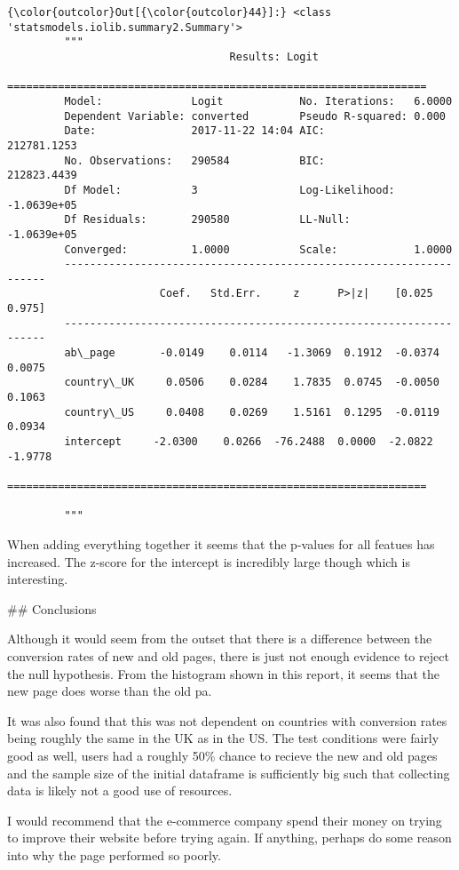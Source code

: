 \documentclass[11pt]{article}
\begin{document}
\begin{Verbatim}[commandchars=\\\{\}]
{\color{outcolor}Out[{\color{outcolor}44}]:} <class 'statsmodels.iolib.summary2.Summary'>
         """
                                   Results: Logit
         ==================================================================
         Model:              Logit            No. Iterations:   6.0000     
         Dependent Variable: converted        Pseudo R-squared: 0.000      
         Date:               2017-11-22 14:04 AIC:              212781.1253
         No. Observations:   290584           BIC:              212823.4439
         Df Model:           3                Log-Likelihood:   -1.0639e+05
         Df Residuals:       290580           LL-Null:          -1.0639e+05
         Converged:          1.0000           Scale:            1.0000     
         -------------------------------------------------------------------
                        Coef.   Std.Err.     z      P>|z|    [0.025   0.975]
         -------------------------------------------------------------------
         ab\_page       -0.0149    0.0114   -1.3069  0.1912  -0.0374   0.0075
         country\_UK     0.0506    0.0284    1.7835  0.0745  -0.0050   0.1063
         country\_US     0.0408    0.0269    1.5161  0.1295  -0.0119   0.0934
         intercept     -2.0300    0.0266  -76.2488  0.0000  -2.0822  -1.9778
         ==================================================================
         
         """
\end{Verbatim}
            
    When adding everything together it seems that the p-values for all
featues has increased. The z-score for the intercept is incredibly large
though which is interesting.

     \#\# Conclusions

    Although it would seem from the outset that there is a difference
between the conversion rates of new and old pages, there is just not
enough evidence to reject the null hypothesis. From the histogram shown
in this report, it seems that the new page does worse than the old pa.

It was also found that this was not dependent on countries with
conversion rates being roughly the same in the UK as in the US. The test
conditions were fairly good as well, users had a roughly 50\% chance to
recieve the new and old pages and the sample size of the initial
dataframe is sufficiently big such that collecting data is likely not a
good use of resources.

I would recommend that the e-commerce company spend their money on
trying to improve their website before trying again. If anything,
perhaps do some reason into why the page performed so poorly.


    
    
    
    
\end{document}
